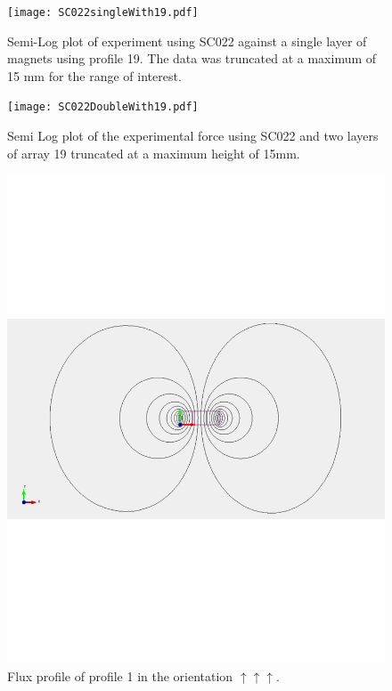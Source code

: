 \begin{figure}[htbp]
\centering
\texttt{[image: SC022singleWith19.pdf]}
\caption{Semi-Log plot of experiment using SC022 against a single layer of magnets using profile 19.  The data was truncated at a maximum of 15 mm for the range of interest.}
\label{fig_force22_one}
\end{figure}

\begin{figure}[htbp]
\centering
\texttt{[image: SC022DoubleWith19.pdf]}
\caption{Semi Log plot of the experimental force using SC022 and two layers of array 19 truncated at a maximum height of 15mm.}
\label{fig_force22_two}
\end{figure}

\begin{figure}[htbp]
\centering
\includegraphics[scale=0.3, clip=true, trim=0cm 5cm 0cm 5cm\textwidth]{figures/FluxProfile1SingleLayer.pdf}
\caption{Flux profile of profile 1 in the orientation $\uparrow \uparrow \uparrow$.}
\label{fig_fluxprofile_1}
\end{figure}

